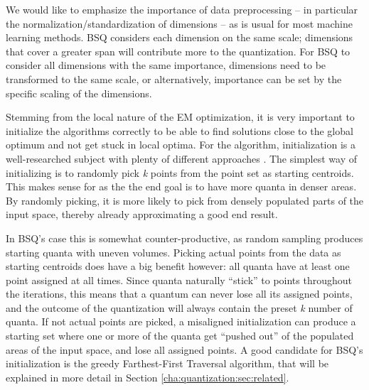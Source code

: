 			We would like to emphasize the importance of data preprocessing -- in particular the normalization/standardization of dimensions -- as is usual for most machine learning methods.
			\ac{BSQ} considers each dimension on the same scale; dimensions that cover a greater span will contribute more to the quantization.
			For \ac{BSQ} to consider all dimensions with the same importance, dimensions need to be transformed to the same scale, or alternatively, importance can be set by the specific scaling of the dimensions.
			
			Stemming from the local nature of the \ac{EM} optimization, it is very important to initialize the algorithms correctly to be able to find solutions close to the global optimum and not get stuck in local optima.
			For the \kmeans{} algorithm, initialization is a well-researched subject with plenty of different approaches \cite{celebi_comparative}.
			The simplest way of initializing \kmeans{} is to randomly pick \textit{k} points from the point set as starting centroids.
			This makes sense for \kmeans{} as the the end goal is to have more quanta in denser areas.
			By randomly picking, it is more likely to pick from densely populated parts of the input space, thereby already approximating a good end result.
			
			In \ac{BSQ}'s case this is somewhat counter-productive, as random sampling produces starting quanta with uneven volumes.
			Picking actual points from the data as starting centroids does have a big benefit however: all quanta have at least one point assigned at all times.
			Since quanta naturally ``stick'' to points throughout the iterations, this means that a quantum can never lose all its assigned points, and the outcome of the quantization will always contain the preset \textit{k} number of quanta.
			If not actual points are picked, a misaligned initialization can produce a starting set where one or more of the quanta get ``pushed out'' of the populated areas of the input space, and lose all assigned points.
			A good candidate for \ac{BSQ}'s initialization is the greedy Farthest-First Traversal algorithm, that will be explained in more detail in Section \ref{cha:quantization:sec:related}.
			
